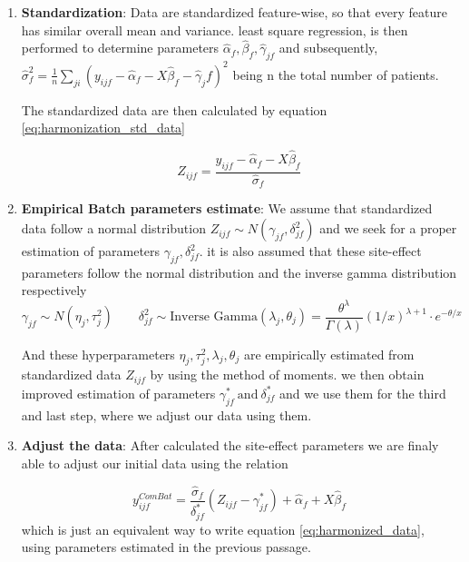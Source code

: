 \documentclass[10pt]{report}
\begin{document}
\begin{enumerate}
\item \textbf{Standardization}: Data are standardized feature-wise, so that every feature has similar overall mean and variance.
least square regression, is then performed to determine parameters $\hat \alpha_f, \hat \beta_f, \hat \gamma_{jf}$ and subsequently, $\hat \sigma^2_f = \frac{1}{n} \sum_{ji} \left ( y_{ijf} - \hat \alpha_f - X \hat \beta_f - \hat \gamma_jf \right )^2$ being n the total number of patients.


The standardized data are then calculated by equation \ref{eq:harmonization_std_data}

\begin{equation}\label{eq:harmonization_std_data}
Z_{ijf} = \frac{y_{ijf}-\hat \alpha_f - X \hat \beta_f}{\hat \sigma_f}
\end{equation}


\item \textbf{Empirical Batch parameters estimate}:
We assume that standardized data follow a normal distribution $Z_{ijf} \sim N(\gamma_{jf}, \delta^2_{jf})$ and we seek for a proper estimation of parameters $\gamma_{jf}, \delta^2_{jf}$.
it is also assumed that these site-effect parameters follow the normal distribution and the inverse gamma distribution respectively
\[
\gamma_{jf} \sim N(\eta_j, \tau^2_j)  \qquad \delta^2_{jf} \sim \text{Inverse Gamma}(\lambda_j, \theta_j) =  \frac{\theta^{\lambda}}{\Gamma (\lambda)}(1/x)^{\lambda +1}\cdot e^{-\theta/x}
\]

And these hyperparameters $\eta_j, \tau^2_j, \lambda_j, \theta_j$ are empirically estimated from standardized data  $Z_{ijf}$ by using the method of moments.
we then obtain improved estimation of parameters $\gamma^\ast_{jf} \ \text{and} \ \delta^\ast_{jf}$ and we use them for the third and last step, where we adjust our data using them.

\item \textbf{Adjust the data}: After calculated the site-effect parameters we are finaly able to adjust our initial data using the relation

\begin{equation}
y^{ComBat}_{ijf} = \frac{\hat \sigma_f}{\delta^\ast_{jf}}(Z_{ijf} - \gamma^\ast_{jf}) + \hat \alpha_f + X \hat \beta_f
\end{equation}
which is just an equivalent way to write equation \ref{eq:harmonized_data}, using parameters estimated in the previous passage.
\end{enumerate}
\end{document}
